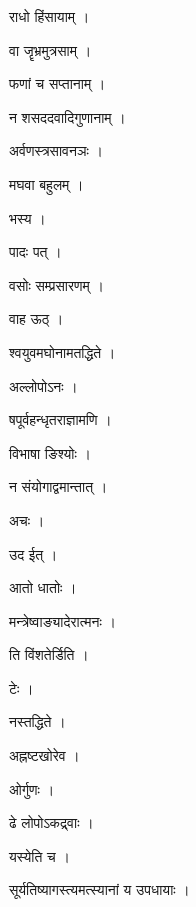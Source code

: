 \documentclass[10pt, openany]{book}
\begin{document}
\noindent राधो हिंसायाम् ।

\noindent वा जॄभ्रमुत्रसाम् ।

\noindent फणां च सप्तानाम् ।

\noindent न शसददवादिगुणानाम् ।

\noindent अर्वणस्त्रसावनञः ।

\noindent मघवा बहुलम् ।

\noindent भस्य ।

\noindent पादः पत् ।

\noindent वसोः सम्प्रसारणम् ।

\noindent वाह ऊठ् ।

\noindent श्वयुवमघोनामतद्धिते ।

\noindent अल्लोपोऽनः ।

\noindent षपूर्वहन्धृतराज्ञामणि ।

\noindent विभाषा ङिश्योः ।

\noindent न संयोगाद्वमान्तात् ।

\noindent अचः ।

\noindent उद ईत् ।

\noindent आतो धातोः ।

\noindent मन्त्रेष्वाङ्यादेरात्मनः ।

\noindent ति विंशतेर्डिति ।

\noindent टेः ।

\noindent नस्तद्धिते ।

\noindent अह्नष्टखोरेव ।

\noindent ओर्गुणः ।

\noindent ढे लोपोऽकद्र्वाः ।

\noindent यस्येति च ।

\noindent सूर्यतिष्यागस्त्यमत्स्यानां य उपधायाः ।
\end{document}

